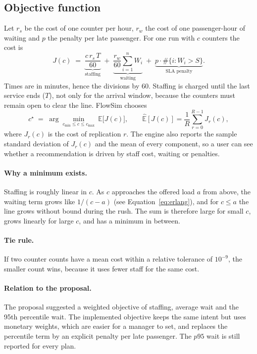 \documentclass[11pt,a4paper]{article}
\begin{document}
\subsection{Objective function}
Let $r_s$ be the cost of one counter per hour, $r_w$ the cost of one passenger-hour of waiting and $p$ the penalty per late
passenger. For one run with $c$ counters the cost is
\[
  J(c) \;=\; \underbrace{\frac{c\, r_s\, T}{60}}_{\text{staffing}}
   \;+\; \underbrace{\frac{r_w}{60}\sum_{i=1}^{n} W_i}_{\text{waiting}}
   \;+\; \underbrace{p\cdot \#\{i : W_i > S\}}_{\text{SLA penalty}} .
\]
Times are in minutes, hence the divisions by 60. Staffing is charged until the last service ends ($T$), not only for the
arrival window, because the counters must remain open to clear the line. FlowSim chooses
\[
  c^\star \;=\; \arg\min_{c_{\min}\le c\le c_{\max}} \ \mathbb{E}\bigl[J(c)\bigr],
  \qquad
  \widehat{\mathbb{E}}[J(c)] = \frac1R\sum_{r=0}^{R-1} J_r(c),
\]
where $J_r(c)$ is the cost of replication $r$. The engine also reports the sample standard deviation of $J_r(c)$ and the
mean of every component, so a user can see whether a recommendation is driven by staff cost, waiting or penalties.

\paragraph{Why a minimum exists.} Staffing is roughly linear in $c$. As $c$ approaches the offered load $a$ from above, the
waiting term grows like $1/(c-a)$ (see Equation~\eqref{eq:erlang}), and for $c\le a$ the line grows without bound during
the rush. The sum is therefore large for small $c$, grows linearly for large $c$, and has a minimum in between.

\paragraph{Tie rule.} If two counter counts have a mean cost within a relative tolerance of $10^{-9}$, the smaller count
wins, because it uses fewer staff for the same cost.

\paragraph{Relation to the proposal.} The proposal suggested a weighted objective of staffing, average wait and the
95th percentile wait. The implemented objective keeps the same intent but uses monetary weights, which are easier for a
manager to set, and replaces the percentile term by an explicit penalty per late passenger. The $p95$ wait is still
reported for every plan.
\end{document}
